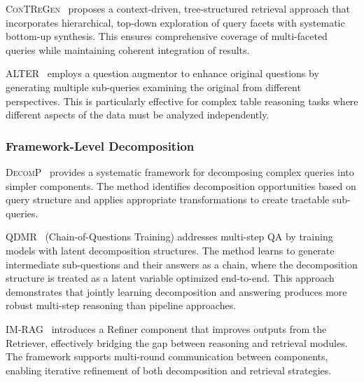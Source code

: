 \documentclass{article}
\begin{document}
\textsc{ConTReGen}~\citep{ConTReGen} proposes a context-driven, tree-structured retrieval approach that incorporates hierarchical, top-down exploration of query facets with systematic bottom-up synthesis. This ensures comprehensive coverage of multi-faceted queries while maintaining coherent integration of results.

\textsc{ALTER}~\citep{ALTER} employs a question augmentor to enhance original questions by generating multiple sub-queries examining the original from different perspectives. This is particularly effective for complex table reasoning tasks where different aspects of the data must be analyzed independently.

\subsubsection{Framework-Level Decomposition}

\textsc{DecomP}~\citep{DecomP} provides a systematic framework for decomposing complex queries into simpler components. The method identifies decomposition opportunities based on query structure and applies appropriate transformations to create tractable sub-queries.

\textsc{QDMR}~\citep{QDMR} (Chain-of-Questions Training) addresses multi-step QA by training models with latent decomposition structures. The method learns to generate intermediate sub-questions and their answers as a chain, where the decomposition structure is treated as a latent variable optimized end-to-end. This approach demonstrates that jointly learning decomposition and answering produces more robust multi-step reasoning than pipeline approaches.

\textsc{IM-RAG}~\citep{IM-RAG} introduces a Refiner component that improves outputs from the Retriever, effectively bridging the gap between reasoning and retrieval modules. The framework supports multi-round communication between components, enabling iterative refinement of both decomposition and retrieval strategies.
\end{document}
